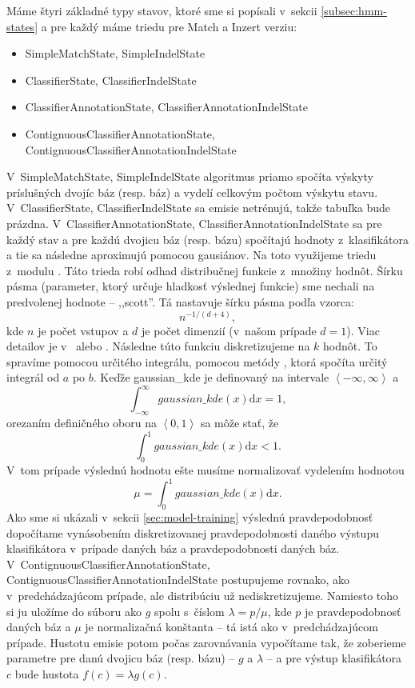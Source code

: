 Máme štyri základné typy stavov, ktoré sme si popísali v~sekcii \ref{subsec:hmm-states} a pre každý máme triedu pre Match a Inzert verziu:
\begin{itemize}
    \item SimpleMatchState, SimpleIndelState
    \item ClassifierState, ClassifierIndelState
    \item ClassifierAnnotationState, ClassifierAnnotationIndelState
    \item ContignuousClassifierAnnotationState, ContignuousClassifierAnnotationIndelState
\end{itemize}

V~SimpleMatchState, SimpleIndelState algoritmus priamo spočíta výskyty príslušných dvojíc báz (resp. báz) a vydelí celkovým počtom výskytu stavu.
V~ClassifierState, ClassifierIndelState sa emisie netrénujú, takže tabuľka bude prázdna.
V~ClassifierAnnotationState, ClassifierAnnotationIndelState sa pre každý stav a pre každú dvojicu báz (resp. bázu) spočítajú hodnoty z~klasifikátora a tie sa následne aproximujú pomocou gausiánov. Na toto využijeme triedu  z~modulu . Táto trieda robí odhad distribučnej funkcie z~množiny hodnôt. Šírku pásma (parameter, ktorý určuje hladkosť výslednej funkcie) sme nechali na predvolenej hodnote -- ,,scott''. Tá nastavuje šírku pásma podľa vzorca:
$$n^{-1/(d+4)},$$
kde $n$ je počet vstupov a $d$ je počet dimenzií (v~našom prípade $d = 1$). Viac detailov je v~\cite{scipydoc} alebo \cite{wiki:kde, rosenblatt1956remarks}. Následne túto funkciu diskretizujeme na $k$ hodnôt. To spravíme pomocou určitého integrálu, pomocou metódy , ktorá spočíta určitý integrál od $a$ po $b$.
Keďže gaussian\_kde je definovaný na intervale $\left<-\infty, \infty \right>$ a $$\int_{-\infty}^\infty \! gaussian\_kde(x) \mathrm{d}x = 1,$$ orezaním definičného oboru na $\left<0,1\right>$ sa môže stať, že $$\int_0^1 \! gaussian\_kde(x) \mathrm{d}x < 1.$$ V~tom prípade výslednú hodnotu ešte musíme normalizovať vydelením hodnotou $$\mu = \int_0^1 \! gaussian\_kde(x) \mathrm{d}x.$$ Ako sme si ukázali v~sekcii \ref{sec:model-training} výslednú pravdepodobnosť dopočítame vynásobením diskretizovanej pravdepodobnosti daného výstupu klasifikátora v~prípade daných báz a pravdepodobnosti daných báz.
V~ContignuousClassifierAnnotationState, ContignuousClassifierAnnotationIndelState postupujeme rovnako, ako v~predchádzajúcom prípade, ale distribúciu už nediskretizujeme. Namiesto toho si ju uložíme do súboru ako $g$ spolu s~číslom $\lambda = p/\mu$, kde $p$ je pravdepodobnosť daných báz a $\mu$ je normalizačná konštanta -- tá istá ako v~predchádzajúcom prípade. Hustotu emisie potom počas zarovnávania vypočítame tak, že zoberieme parametre pre danú dvojicu báz (resp. bázu) -- $g$ a $\lambda$ -- a pre výstup klasifikátora $c$ bude hustota $f(c) = \lambda g(c).$

